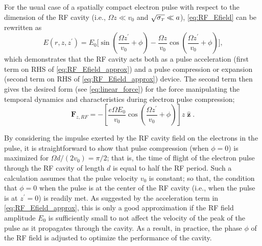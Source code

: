 For the usual case of a spatially compact electron pulse with respect to the dimension of the RF cavity (i.e., $ \Omega z \ll v_{{ \scriptscriptstyle 0}} $ and $ \sqrt{\sigma_{{\scriptscriptstyle T}}} \ll a $), \ref{eq:RF_Efield} can be rewritten as
\begin{equation} \label{eq:RF_Efield_approx}
  E ( r , z , z^{\prime} ) = E_{0} \biggl [ \sin \left ( \frac{ \Omega z^{\prime} }{ v_{{ \scriptscriptstyle 0}} } + \phi \right ) - \frac{ \Omega z }{ v_{{ \scriptscriptstyle 0}} } \cos \left ( \frac{ \Omega z^{\prime} }{ v_{{ \scriptscriptstyle 0}} } + \phi \right ) \biggr ] \text{,}
\end{equation}
which demonstrates that the RF cavity acts both as a pulse acceleration (first term on RHS of \ref{eq:RF_Efield_approx}) and a pulse compression or expansion (second term on RHS of \eqref{eq:RF_Efield_approx}) device.
The second term then gives the desired form (see \ref{eq:linear_force}) for the force manipulating the temporal dynamics and characteristics during electron pulse compression;
\begin{equation} \label{eq:RF_Force_z}
  \boldsymbol{F}_{ z , RF } = - \left [ \frac{ e \Omega E_{0} }{ v_{{ \scriptscriptstyle 0}} } \cos \left ( \frac{ \Omega z^{\prime} }{ v_{{ \scriptscriptstyle 0}} } + \phi \right ) \right ] z \hat{\operatorname{ \boldsymbol{z} }} \text{.}
\end{equation}

By considering the impulse exerted by the RF cavity field on the electrons in the pulse, it is straightforward to show that pulse compression (when $\phi = 0$) is maximized for $ \Omega d / (2 v_{{ \scriptscriptstyle 0}} ) = \pi /2 $; that is, the time of flight of the electron pulse through the RF cavity of length $ d $ is equal to half the RF period.
Such a calculation assumes that the pulse velocity $v_{{ \scriptscriptstyle 0}}$ is constant; so that, the condition that $ \phi = 0 $ when the pulse is at the center of the RF cavity (i.e., when the pulse is at $ z^{\prime} = 0 $) is readily met.
As suggested by the acceleration term in \ref{eq:RF_Efield_approx}, this is only a good approximation if the RF field amplitude $E_{0}$ is sufficiently small to not affect the velocity of the peak of the pulse as it propagates through the cavity.
As a result, in practice, the phase $\phi$ of the RF field is adjusted to optimize the performance of the cavity.

